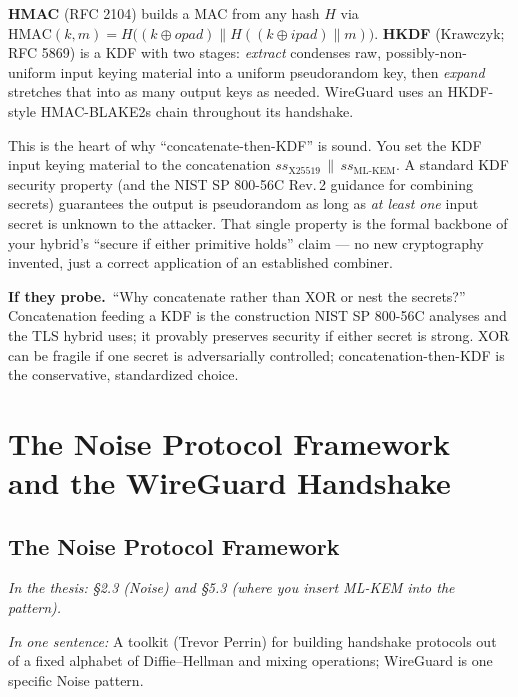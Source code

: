 \documentclass[11pt]{article}
\newcommand{\seethesis}[1]{%
  {\small\color{softgray}\textit{In the thesis: #1}}\par\vspace{3pt}}
\newcommand{\keyq}[1]{%
  \par\vspace{0.4em}%
  \noindent\colorbox{boxbg}{%
    \parbox{\dimexpr\textwidth-2\fboxsep}{%
      \small\textbf{\color{deepcyan}If they probe.}\ #1}}%
  \par\vspace{0.5em}}
\newcommand{\nutshell}[1]{\noindent\textit{In one sentence:} #1\par\vspace{4pt}}
\begin{document}
\textbf{HMAC} (RFC 2104) builds a MAC from any hash $H$ via
$\mathrm{HMAC}(k,m) = H\big((k\oplus opad)\mathbin\| H((k\oplus ipad)\mathbin\| m)\big)$.
\textbf{HKDF} (Krawczyk; RFC 5869) is a KDF with two stages: \emph{extract}
condenses raw, possibly-non-uniform input keying material into a uniform
pseudorandom key, then \emph{expand} stretches that into as many output keys as
needed. WireGuard uses an HKDF-style HMAC-BLAKE2s chain throughout its handshake.

This is the heart of why ``concatenate-then-KDF'' is sound. You set the KDF input
keying material to the concatenation $ss_{\text{X25519}} \,\|\, ss_{\text{ML-KEM}}$.
A standard KDF security property (and the NIST SP 800-56C Rev.\,2 guidance for
combining secrets) guarantees the output is pseudorandom as long as \emph{at
least one} input secret is unknown to the attacker. That single property is the
formal backbone of your hybrid's ``secure if either primitive holds'' claim ---
no new cryptography invented, just a correct application of an established
combiner.

\keyq{``Why concatenate rather than XOR or nest the secrets?'' Concatenation
feeding a KDF is the construction NIST SP 800-56C analyses and the TLS hybrid
uses; it provably preserves security if either secret is strong. XOR can be
fragile if one secret is adversarially controlled; concatenation-then-KDF is the
conservative, standardized choice.}

\section{The Noise Protocol Framework and the WireGuard Handshake}

\subsection{The Noise Protocol Framework}
\seethesis{\S2.3 (Noise) and \S5.3 (where you insert ML-KEM into the pattern).}
\nutshell{A toolkit (Trevor Perrin) for building handshake protocols out of a
fixed alphabet of Diffie--Hellman and mixing operations; WireGuard is one
specific Noise pattern.}
\end{document}
